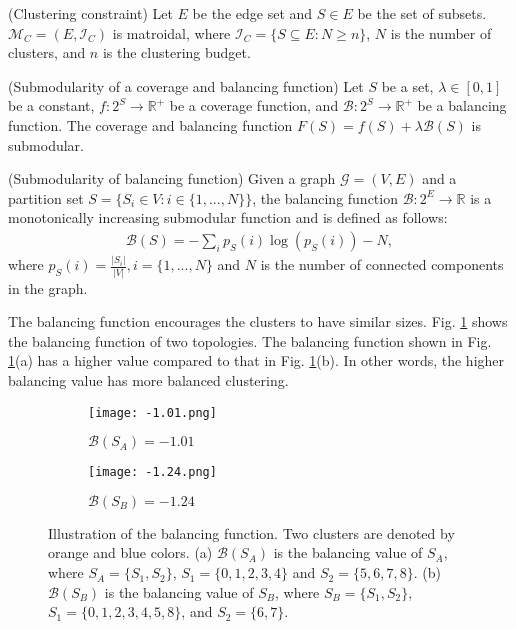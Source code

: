 \begin{theorem} \label{thm:clustering-matroid} (Clustering constraint) \cite{liu2013entropy}
Let $E$ be the edge set and $S \in E$ be the set of subsets. $\mathcal{M}_C=(E, \mathcal{I}_C)$ is matroidal, where $\mathcal{I}_C=\{S \subseteq E : N \geq n \}$, $N$ is the number of clusters, and $n$ is the clustering budget. \\
\end{theorem}

\begin{theorem} \label{thm:proposed-obj} (Submodularity of a coverage and balancing function) \cite{li2024mrsis}
Let $S$ be a set, $\lambda \in [0,1]$ be a constant, $f:2^S \rightarrow \mathbb{R}^+$ be a coverage function, and $\mathcal{B}: 2^S \rightarrow \mathbb{R}^+$ be a balancing function.
The coverage and balancing function $F(S)=f(S)+\lambda \mathcal{B}(S)$ is submodular. \\
\end{theorem}

\begin{theorem} \label{thm:balance} (Submodularity of balancing function) \cite{liu2013entropy}
 Given a graph $\mathcal{G}=(V, E)$ and a partition set $S=\{S_i \in V : i\in \{1,...,N\}\}$, the balancing function $\mathcal{B}:2^E \rightarrow \mathbb{R}$ is a monotonically increasing submodular function and is defined as follows:
 \begin{align*}
     \mathcal{B}(S)=-\sum_{i} {p_S(i)\log({p_S(i)})-N},
 \end{align*}
 where $p_S(i)=\frac{|S_i|}{|V|}, i=\{1,...,N\}$ and $N$ is the number of connected components in the graph.

 The balancing function encourages the clusters to have similar sizes. Fig. \ref{balancing-func} shows the balancing function of two topologies. The balancing function shown in Fig. \ref{balancing-func}(a) has a higher value compared to that in Fig. \ref{balancing-func}(b). In other words, the higher balancing value has more balanced clustering.\\
\end{theorem}

\begin{figure}
    \centering
    \begin{subfigure}[b]{0.4\textwidth}
    \centering
        \texttt{[image: -1.01.png]}
        \caption{$\mathcal{B}(S_A)=-1.01$}
    \end{subfigure}
    \hfill
    \quad
    \begin{subfigure}[b]{0.4\textwidth}
        \texttt{[image: -1.24.png]}
        \caption{$\mathcal{B}(S_B)=-1.24$}
    \end{subfigure}
    \hfill

    \caption{Illustration of the balancing function. Two clusters are denoted by orange and blue colors. (a) $\mathcal{B}(S_A)$ is the balancing value of $S_A$, where $S_A=\{S_1,S_2\}$, $S_1=\{0,1,2,3,4\}$ and $S_2=\{5,6,7,8\}$. (b) $\mathcal{B}(S_B)$ is the balancing value of $S_B$, where $S_B=\{S_1,S_2\}$, $S_1=\{0,1,2,3,4,5,8\}$, and $S_2=\{6,7\}$.
    }
    \label{balancing-func}
\end{figure}

